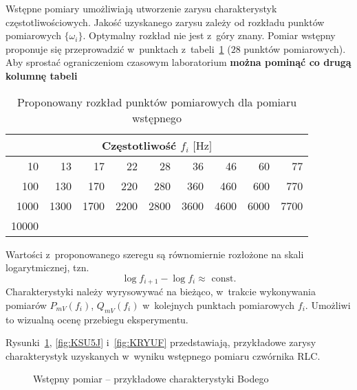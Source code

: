 \documentclass[paper=a4,DIV=12]{lpas}
\begin{document}
\begin{appendices}
  Wstępne pomiary umożliwiają utworzenie zarysu charakterystyk
  częstotliwościowych. Jakość uzyskanego zarysu zależy od rozkładu punktów
  pomiarowych $\{\omega_i\}$. Optymalny rozkład nie jest z~góry znany. Pomiar
  wstępny proponuje się przeprowadzić w~punktach z~tabeli~\ref{tab:D3Y3O} ($28$
  punktów pomiarowych). Aby sprostać ograniczeniom czasowym laboratorium
  \textbf{można pominąć co drugą kolumnę tabeli}
  \begin{table}[H]
    \centering
    \begin{tabular}{|r|r|r|r|r|r|r|r|r|}
      \hline
      \multicolumn{9}{|c|}{Częstotliwość $f_i\text{ [Hz]}$} \\
      \hline\hline
      10 &    13 &    17 &    22 &    28 &    36 &    46 &    60 &    77 \\
      100 &   130 &   170 &   220 &   280 &   360 &   460 &   600 &   770 \\
      1000 &  1300 &  1700 &  2200 &  2800 &  3600 &  4600 &  6000 &  7700 \\
      10000 &       &       &       &       &       &       &       & \\\hline
    \end{tabular}
    \caption{Proponowany rozkład punktów pomiarowych dla pomiaru wstępnego}
    \label{tab:D3Y3O}
  \end{table}
  Wartości z~proponowanego szeregu są równomiernie rozłożone na skali
  logarytmicznej, tzn.
  \begin{equation}
    \log{f_{i+1}} - \log{f_i} \approx \text{ const}.
    \label{eq:I4BBA}
  \end{equation}
  Charakterystyki należy wyrysowywać na bieżąco, w~trakcie wykonywania pomiarów
  $P_{mV}(f_i)$, $Q_{mV}(f_i)$ w~kolejnych punktach pomiarowych $f_i$. Umożliwi
  to wizualną ocenę przebiegu eksperymentu.

  Rysunki~\ref{fig:P2GUQ}, \ref{fig:KSU5J} i~\ref{fig:KRYUF} przedstawiają,
  przykładowe zarysy charakterystyk uzyskanych w~wyniku wstępnego pomiaru
  czwórnika RLC.
  \begin{figure}[H]
    \centering
    
    \caption{Wstępny pomiar -- przykładowe charakterystyki Bodego}
    \label{fig:P2GUQ}
  \end{figure}


\end{appendices}
\end{document}
